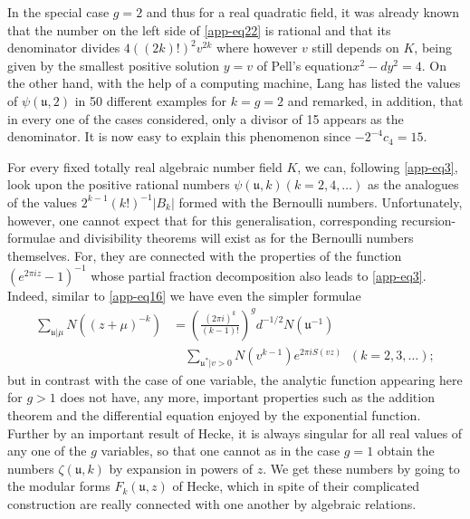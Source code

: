 In the special case $g=2$ and thus for a real quadratic field, it was
already known that the number on the left side of \eqref{app-eq22} is
rational and that its denominator divides $4((2k)!)^{2}v^{2k}$ where
however $v$ still depends on $K$, being given by the smallest positive
solution $y=v$ of Pell's equation\pageoriginale $x^{2}-dy^{2}=4$. On
the other hand, with the help of a computing machine, Lang has listed
the values of $\psi(\mathfrak{u},2)$ in 50 different examples for
$k=g=2$ and remarked, in addition, that in every one of the cases
considered, only a divisor of 15 appears as the denominator. It is now
easy to explain this phenomenon since $-2^{-4}c_{4}=15$.

For every fixed totally real algebraic number field $K$, we can,
following \eqref{app-eq3}, look upon the positive rational numbers
$\psi(\mathfrak{u},k)(k=2,4,\ldots)$ as the analogues of the values
$2^{k-1}(k!)^{-1}|B_{k}|$ formed with the Bernoulli
numbers. Unfortunately, however, one cannot expect that for this
generalisation, corresponding recursion-formulae and divisibility
theorems will exist as for the Bernoulli numbers themselves. For, they
are connected with the properties of the function $(e^{2\pi
  iz}-1)^{-1}$ whose partial fraction decomposition also leads to
\eqref{app-eq3}. Indeed, similar to \eqref{app-eq16} we have even the
simpler formulae
\begin{align*}
\sum_{\mathfrak{u}|\mu} N((z+\mu)^{-k})
&=\left(\frac{(2\pi
    i)^{k}}{(k-1)!}\right)^{g}d^{-1/2}N(\mathfrak{u}^{-1})\\
&\quad\sum_{\mathfrak{u}^{\ast}|v>0}N(v^{k-1})e^{2\pi  iS(vz)} \;\; 
(k=2,3,\ldots);
\end{align*}
but in contrast with the case of one variable, the analytic function
appearing here for $g>1$ does not have, any more, important properties
such as the addition theorem and the differential equation enjoyed by
the exponential function. Further by an important result of Hecke, it
is always singular for all real values of any one of the $g$
variables, so that one cannot as in the case $g=1$ obtain the numbers
$\zeta(\mathfrak{u},k)$ by expansion in powers of $z$. We get these
numbers by going to the modular forms $F_{k}(\mathfrak{u},z)$ of
Hecke, which in spite of their complicated construction are really
connected with one another by algebraic relations.

